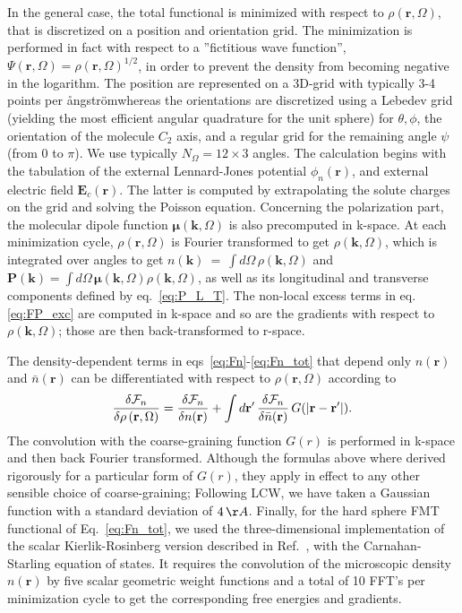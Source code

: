 \documentclass[aip,jcp,preprint]{revtex4-1}
\newcommand{\rr}{\mathbf{r}}
\newcommand{\kk}{\mathbf{k}}
\newcommand{\rhorom}{{\rho\left({\mathbf r},\Omega\right)}}
\newcommand{\F}{{\cal F}}
\newcommand{\MU}{\boldsymbol{\mu}}
\newcommand{\rhonbar}{\bar{n}({\mathbf r})}
\newcommand{\PP}{\mathbf{P}}
\newcommand{\EE}{\mathbf{E}}
\newcommand{\angstrom}{\r{a}ngstr\"{o}m}
\begin{document}
In the general case, the total functional  is minimized with respect to $\rhorom$, that is discretized  on a  position and orientation grid.  The minimization is performed in fact with respect to a ''fictitious wave function'', $\Psi(\rr,\Omega)=\rho(\rr,\Omega)^{1/2}$,  in order to prevent the density from becoming negative in the logarithm. The position are represented on a 3D-grid with typically 3-4  points per \angstrom whereas the orientations are discretized using a Lebedev grid (yielding the most efficient angular quadrature for the unit sphere\cite{lebedev99}) for $\theta, \phi$, the orientation of the molecule $C_{2}$ axis, and a regular grid for the remaining angle $\psi$ (from $0$ to $\pi$). We use typically $N_\Omega = 12 \times 3$ angles. The calculation begins with the tabulation of the external Lennard-Jones potential $\phi_n(\rr)$, and external electric field $\EE_c(\rr)$. The latter is computed by extrapolating the solute charges on the grid and solving the Poisson equation. Concerning the polarization part, the molecular dipole function $\MU(\kk,\Omega)$ is also precomputed in k-space.   At each minimization cycle, $\rhorom$ is Fourier transformed to get 
$\rho(\kk,\Omega)$,  which is integrated over angles to get $n(\kk)~=~\int d\Omega \, \rho(\kk,\Omega)$ and $\PP(\kk) = \int d\Omega \, \MU(\kk,\Omega) \rho(\kk,\Omega)$,  as well as  its longitudinal and transverse components defined by eq.~\ref{eq:P_L_T}.
The non-local excess terms in eq.\ref{eq:FP_exc} are computed in k-space and so are the gradients with respect to $\rho(\kk,\Omega)$; those are then back-transformed to r-space. 

The density-dependent terms in eqs~\ref{eq:Fn}-\ref{eq:Fn_tot}  that depend only $n(\rr)$ and 
$\rhonbar$ can be differentiated with respect to $\rhorom$ according to 
\begin{equation}
    \frac{\delta \F_n}{\delta \rhorom} =  \frac{\delta \F_n}{\delta n(\rr)} + \int d\rr' \, \frac{\delta \F_n}{\delta \rhonbar} \, G(|\rr - \rr'|).
\end{equation}
The convolution with the coarse-graining function $G(r)$  is performed in k-space and then back Fourier transformed. Although the formulas above where derived rigorously for a particular form of $G(r)$, they apply in effect to any other sensible choice of coarse-graining; Following LCW\cite{lum99}, we have taken a Gaussian function with a standard deviation of $4 \, \AA$.  Finally, for the hard sphere FMT functional of Eq.~\ref{eq:Fn_tot}, we used the three-dimensional implementation of the scalar Kierlik-Rosinberg version described in Ref.~, with the Carnahan-Starling equation of states. It requires the convolution of the microscopic density $n(\rr)$ by five scalar geometric  weight functions and a total of 10 FFT's per minimization cycle to get the corresponding free energies and gradients. 
\end{document}
